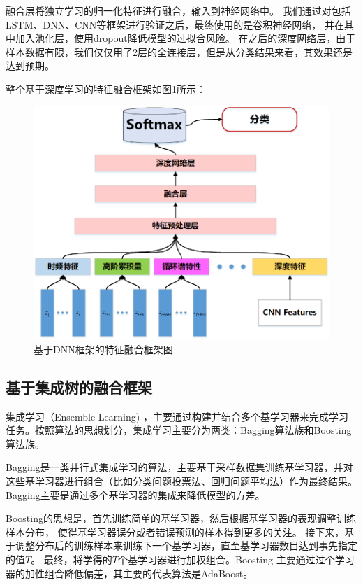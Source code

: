 融合层将独立学习的归一化特征进行融合，输入到神经网络中。
我们通过对包括LSTM、DNN、CNN等框架进行验证之后，最终使用的是卷积神经网络，
并在其中加入池化层，使用dropout降低模型的过拟合风险。
在之后的深度网络层，由于样本数据有限，我们仅仅用了2层的全连接层，但是从分类结果来看，其效果还是达到预期。\par


整个基于深度学习的特征融合框架如图\ref{sec:fig_4_3}所示：
\begin{figure}[!h]
	\centering
	\includegraphics[scale=0.55]{figures/chapter_4/fig_4_3}
	\caption{基于DNN框架的特征融合框架图}\label{sec:fig_4_3}
\end{figure}


\subsection{基于集成树的融合框架}
集成学习（Ensemble Learning) ，主要通过构建并结合多个基学习器来完成学习任务。按照算法的思想划分，集成学习主要分为两类：Bagging算法族和Boosting算法族\cite{周志华2016机器学习}。\par

Bagging\cite{breiman1996bagging}是一类井行式集成学习的算法，主要基于采样数据集训练基学习器，并对这些基学习器进行组合（比如分类问题投票法、回归问题平均法）作为最终结果。Bagging主要是通过多个基学习器的集成来降低模型的方差。

Boosting\cite{freund1999short}的思想是，首先训练简单的基学习器，然后根据基学习器的表现调整训练样本分布，
使得基学习器误分或者错误预测的样本得到更多的关注。
接下来，基于调整分布后的训练样本来训练下一个基学习器，直至基学习器数目达到事先指定的值$T$。
最终，将学得的$T$个基学习器进行加权组合。Boosting 主要通过过个学习器的加性组合降低偏差，其主要的代表算法是AdaBoost\cite{freund1996experiments}。\par

